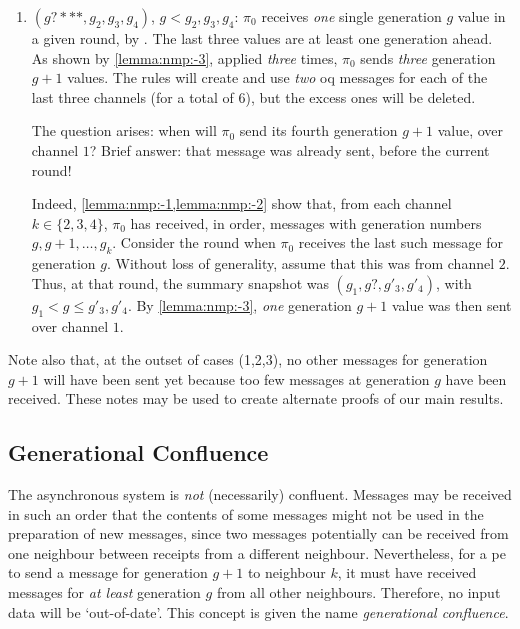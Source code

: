 \begin{remark}
\begin{enumerate}
    \medskip
    \item $(g?***, g_2, g_3, g_4)$, $g < g_2, g_3, g_4$: 
    $\pi_0$ receives \emph{one} single generation $g$ value in a given round, by .
    The last three values are at least one generation ahead.
    As shown by \cref{lemma:nmp:-3}, applied \emph{three} times, 
    $\pi_0$ sends \emph{three} generation $g+1$ values.
    The rules will create and use \emph{two} \gls{oq} messages for each of the last three channels (for a total of 6), but the excess ones will be deleted.
    
    \medskip
    The question arises: when will $\pi_0$ send its fourth generation $g+1$ value, over channel $1$? Brief answer: that message was already sent,
    before the current round!
    
    \medskip
    Indeed, \cref{lemma:nmp:-1,lemma:nmp:-2} show that,
    from each channel $k \in \{ 2, 3, 4\}$, 
    $\pi_0$ has received, in order, 
    messages with generation numbers $g, g+1, \ldots, g_k$.
    Consider the round when $\pi_0$ receives the last such message for generation $g$. Without loss of generality, assume that this was from channel $2$.
    Thus, at that round, the summary snapshot was $(g_1, g?, g'_3, g'_4)$,
    with $g_1 < g \leq g'_3, g'_4$.
    By \cref{lemma:nmp:-3}, \emph{one} generation $g+1$ value was then sent over channel $1$.
    \end{enumerate}    
    
    Note also that, at the outset of cases (1,2,3), no other messages for generation $g+1$ will have been sent yet because too few messages at generation $g$ have been received. 
    These notes may be used to create alternate proofs of our main results.

\end{remark}

\subsection{Generational Confluence}
The asynchronous system is \emph{not} (necessarily) confluent.  Messages may be received in such an order that the contents of some messages might not be used in the preparation of new messages, since two messages potentially can be received from one neighbour between receipts from a different neighbour.  Nevertheless, for a \gls{pe} to send a message for generation \(g + 1\) to neighbour \(k\), it must have received messages for \emph{at least} generation \(g\) from all other neighbours.  Therefore, no input data will be `out-of-date'.  This concept is given the name \emph{generational confluence}.

